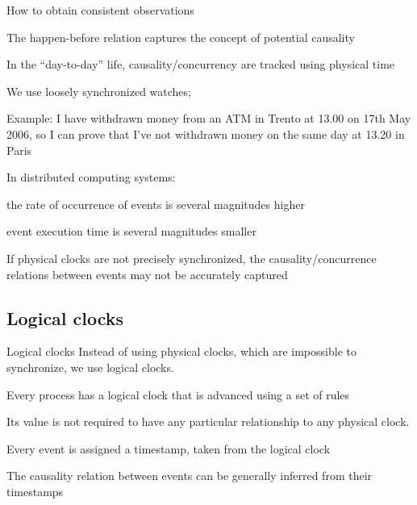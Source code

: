 \begin{frame}{How to obtain consistent observations}

\BIL
\item The happen-before relation captures the concept of potential causality
\item In the ``day-to-day'' life, causality/concurrency are tracked using
  physical time
  \BI
  \item We use loosely synchronized watches;
  \item Example: I have withdrawn money from an ATM in Trento at 13.00 on 17th May 2006,
    so I can prove that I've not withdrawn money on the same day at 13.20 in Paris
  \EI
\item In distributed computing systems:
  \BI
  \item the rate of occurrence of events is several magnitudes higher
  \item event execution time is several magnitudes smaller
  \EI
\item
  If physical clocks are not precisely synchronized, the
  causality/concurrence relations between events may not be accurately captured
\EIL

\end{frame}


\subsection{Logical clocks}

\begin{frame}{Logical clocks}
Instead of using physical clocks, which are impossible to synchronize,
we use logical clocks.
\BI
\item Every process has a \alert{logical clock} that is advanced using a
  set of rules
\item Its value is not required to have any particular relationship to any physical clock.
\item Every event is assigned a timestamp, taken from the logical clock
\item The causality relation between events can be generally inferred
  from their timestamps
\EI
\end{frame}

